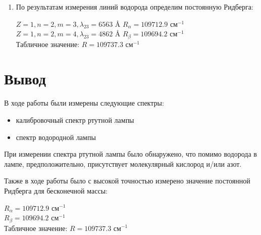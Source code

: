 \documentclass[a4paper]{article}
\begin{document}
\begin{enumerate}
\item По результатам измерения линий водорода определим постоянную Ридберга:
\begin{center}
    $Z = 1, n = 2, m = 3, \lambda_23 = 6563$ \AA \hspace{1cm} $R_{\alpha} = 109712.9$ см$^{-1}$ \\
    $Z = 1, n = 2, m = 4, \lambda_23 = 4862$ \AA \hspace{1cm} $R_{\beta} = 109694.2$ см$^{-1}$ \\
    Табличное значение: $R = 109737.3$ см$^{-1}$
\end{center}

\end{enumerate}

\clearpage

\section{Вывод}
В ходе работы были измерены следующие спектры:
\begin{itemize}
    \item калибровочный спектр ртутной лампы
    \item спектр водородной лампы
\end{itemize}

При измерении спектра ртутной лампы было обнаружено, что помимо водорода в лампе, предположительно, присутствует молекулярный кислород и/или азот. \par
Также в ходе работы было с высокой точностью измерено значение постоянной Ридберга для бесконечной массы: 
\begin{center}
    $R_{\alpha} = 109712.9$ см$^{-1}$ \\
    $R_{\beta} = 109694.2$ см$^{-1}$ \\
    Табличное значение: $R = 109737.3$ см$^{-1}$
\end{center}
\end{document}
